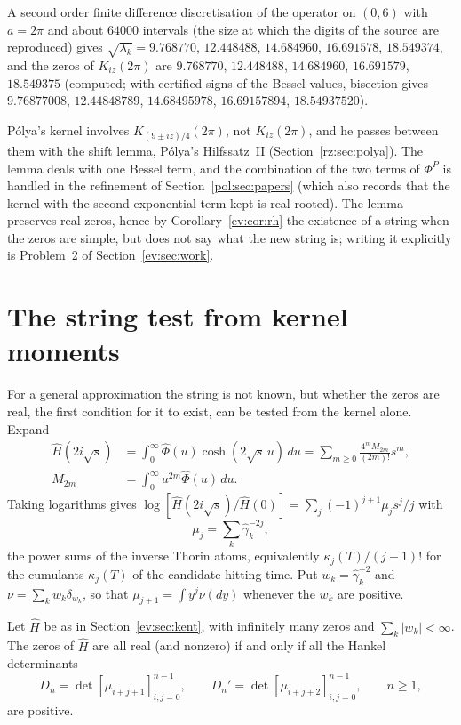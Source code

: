 A second order finite difference discretisation of the operator on $(0,6)$ with $a=2\pi$ and about $64000$ intervals (the size at which the digits of the source are reproduced) gives $\sqrt{\lambda_k}=9.768770$, $12.448488$, $14.684960$, $16.691578$, $18.549374$, and the zeros of $K_{iz}(2\pi)$ are $9.768770$, $12.448488$, $14.684960$, $16.691579$, $18.549375$ (computed; with certified signs of the Bessel values, bisection gives $9.76877008$, $12.44848789$, $14.68495978$, $16.69157894$, $18.54937520$).

P\'olya's kernel involves $K_{(9\pm iz)/4}(2\pi)$, not $K_{iz}(2\pi)$, and he passes between them with the shift lemma, P\'olya's Hilfssatz~II (Section~\ref{rz:sec:polya}). The lemma deals with one Bessel term, and the combination of the two terms of $\Phi^P$ is handled in the refinement of Section~\ref{pol:sec:papers} (which also records that the kernel with the second exponential term kept is real rooted). The lemma preserves real zeros, hence by Corollary~\ref{ev:cor:rh} the existence of a string when the zeros are simple, but does not say what the new string is; writing it explicitly is Problem~2 of Section~\ref{ev:sec:work}.

\section{The string test from kernel moments}\label{ev:sec:string}

For a general approximation the string is not known, but whether the zeros are real, the first condition for it to exist, can be tested from the kernel alone. Expand
\[
\begin{aligned}
\widehat H(2i\sqrt s) &= \int_0^\infty\widehat\Phi(u)\cosh(2\sqrt s\,u)\,du = \sum_{m\ge0}\frac{4^m M_{2m}}{(2m)!}s^m,\\
M_{2m} &= \int_0^\infty u^{2m}\widehat\Phi(u)\,du .
\end{aligned}
\]
Taking logarithms gives $\log[\widehat H(2i\sqrt s)/\widehat H(0)]=\sum_j(-1)^{j+1}\mu_js^j/j$ with
\[
\mu_j = \sum_k\widehat\gamma_k^{-2j},
\]
the power sums of the inverse Thorin atoms, equivalently $\kappa_j(T)/(j-1)!$ for the cumulants $\kappa_j(T)$ of the candidate hitting time. Put $w_k=\widehat\gamma_k^{-2}$ and $\nu=\sum_kw_k\delta_{w_k}$, so that $\mu_{j+1}=\int y^j\nu(dy)$ whenever the $w_k$ are positive.

\begin{proposition}\label{ev:prop:hankel}
Let $\widehat H$ be as in Section~\ref{ev:sec:kent}, with infinitely many zeros and $\sum_k|w_k|<\infty$. The zeros of $\widehat H$ are all real (and nonzero) if and only if all the Hankel determinants
\[
D_n = \det[\mu_{i+j+1}]_{i,j=0}^{n-1}, \qquad D_n' = \det[\mu_{i+j+2}]_{i,j=0}^{n-1}, \qquad n\ge1,
\]
are positive.
\end{proposition}

